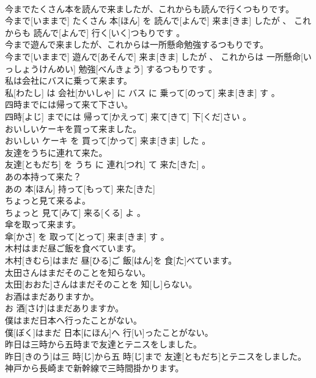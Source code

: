 \documentclass[8pt]{extreport}
\begin{document}
\begin{CJK}{UTF8}{min}
\\	今までたくさん本を読んで来ましたが、これからも読んで行くつもりです。	
\\	今まで[いままで] たくさん 本[ほん] を 読んで[よんで] 来ま[きま] したが 、 これからも 読んで[よんで] 行く[いく]つもりです 。
\\	今まで遊んで来ましたが、これからは一所懸命勉強するつもりです。	
\\	今まで[いままで] 遊んで[あそんで] 来ま[きま] したが 、 これからは 一所懸命[いっしょうけんめい] 勉強[べんきょう] するつもりです 。
\\	私は会社にバスに乗って来ます。	
\\	私[わたし] は 会社[かいしゃ] に バス に 乗って[のって] 来ま[きま] す 。
\\	四時までには帰って来て下さい。	
\\	四時[よじ] までには 帰って[かえって] 来て[きて] 下[くだ]さい 。
\\	おいしいケーキを買って来ました。	
\\	おいしい ケーキ を 買って[かって] 来ま[きま] した 。
\\	友達をうちに連れて来た。	
\\	友達[ともだち] を うち に 連れ[つれ] て 来た[きた] 。
\\	あの本持って来た？	
\\	あの 本[ほん] 持って[もって] 来た[きた] 
\\	ちょっと見て来るよ。	
\\	ちょっと 見て[みて] 来る[くる] よ 。
\\	傘を取って来ます。	
\\	傘[かさ] を 取って[とって] 来ま[きま] す 。
\\	木村はまだ昼ご飯を食べています。	
\\	木村[きむら]はまだ 昼[ひる]ご 飯[はん]を 食[た]べています。
\\	太田さんはまだそのことを知らない。	
\\	太田[おおた]さんはまだそのことを 知[し]らない。
\\	お酒はまだありますか。	
\\	お 酒[さけ]はまだありますか。
\\	僕はまだ日本へ行ったことがない。	
\\	僕[ぼく]はまだ 日本[にほん]へ 行[い]ったことがない。
\\	昨日は三時から五時まで友達とテニスをしました。	
\\	昨日[きのう]は三 時[じ]から五 時[じ]まで 友達[ともだち]とテニスをしました。
\\	神戸から長崎まで新幹線で三時間掛かります。	

\end{CJK}
\end{document}
